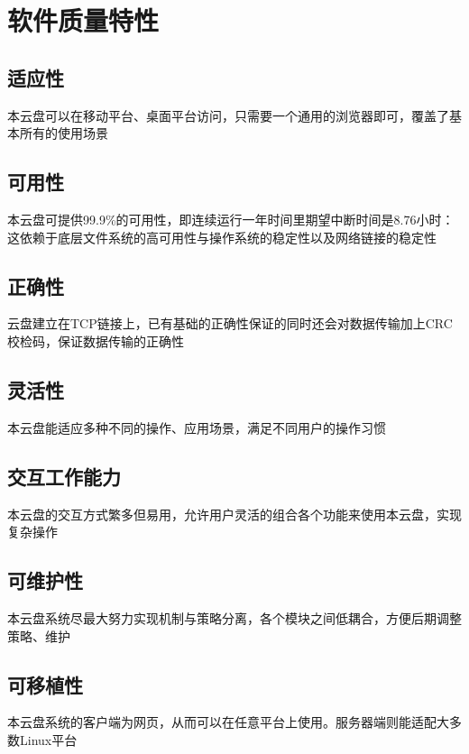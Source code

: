 \chapter{软件质量特性}

\section{适应性}

本云盘可以在移动平台、桌面平台访问，只需要一个通用的浏览器即可，覆盖了基本所有的使用场景

\section{可用性}

本云盘可提供99.9\%的可用性，即连续运行一年时间里期望中断时间是8.76小时：这依赖于底层文件系统的高可用性与操作系统的稳定性以及网络链接的稳定性

\section{正确性}

云盘建立在TCP链接上，已有基础的正确性保证的同时还会对数据传输加上CRC校检码，保证数据传输的正确性

\section{灵活性}

本云盘能适应多种不同的操作、应用场景，满足不同用户的操作习惯

\section{交互工作能力}

本云盘的交互方式繁多但易用，允许用户灵活的组合各个功能来使用本云盘，实现复杂操作

\section{可维护性}

本云盘系统尽最大努力实现机制与策略分离，各个模块之间低耦合，方便后期调整策略、维护

\section{可移植性}

本云盘系统的客户端为网页，从而可以在任意平台上使用。服务器端则能适配大多数Linux平台

